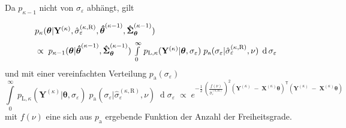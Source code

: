Da $p_{\kappa-1}$ nicht von $\sigma_{\varepsilon}$ abhängt, gilt
\begin{equation}
\arraycolsep=2.0pt\def\arraystretch{2.0}
\begin{array}{l}
p_{\kappa}(\boldsymbol{\theta}| \mathbf{Y}^{(\kappa)}, \hat \sigma_{\varepsilon}^{(\kappa,\mathrm{R})},  \boldsymbol{\hat \theta}^{(\kappa-1)},  \boldsymbol{\hat \Sigma}^{(\kappa-1)}_{\boldsymbol{\theta}}) \\
\; \propto \; p_{\kappa-1}(\boldsymbol{\theta} | \boldsymbol{\hat \theta}^{(\kappa-1)},
\boldsymbol{\hat \Sigma}^{(\kappa-1)}_{\boldsymbol{\theta}}) \,
\int\limits_0^\infty \, p_{\mathrm{L},\kappa} (\mathbf{Y}^{(\kappa)} | \boldsymbol{\theta},
\sigma_{\varepsilon}) \;
p_{\mathrm{a}} (\sigma_{\varepsilon} | \hat \sigma_{\varepsilon}^{(\kappa,\mathrm{R})}, \nu) \;
\operatorname{d}\sigma_{\varepsilon}
\end{array}
\end{equation}
und mit einer vereinfachten Verteilung $p_{\mathrm{a}}(\sigma_{\varepsilon})$
\begin{equation}
\int\limits_0^\infty \, p_{\mathrm{L},\kappa} (\mathbf{Y}^{(\kappa)} |
\boldsymbol{\theta}, \sigma_{\varepsilon}) \;
p_{\mathrm{a}} (\sigma_{\varepsilon} | \hat \sigma_{\varepsilon}^{(\kappa,\mathrm{R})}, \nu) \;
\operatorname{d}\sigma_{\varepsilon}
\; \propto \;
e^{- \frac{1}{2} \, \left(\frac{f(\nu)}{\hat \sigma_{\varepsilon}^{(\kappa,\mathrm{R})}}\right)^2
	\left(\mathbf{Y}^{(\kappa)} \; - \;  \mathbf{X}^{(\kappa)} \boldsymbol{\theta} \right)^\mathsf{T}
	\left(\mathbf{Y}^{(\kappa)} \; - \;  \mathbf{X}^{(\kappa)} \boldsymbol{\theta} \right)}
\end{equation}
mit $f(\nu)$ eine sich aus $p_{\mathrm{a}}$ ergebende Funktion der Anzahl der Freiheitsgrade.

